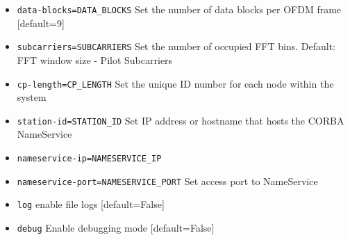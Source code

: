\begin{enumerate}
\begin{itemize}
		\item      \texttt{\option data-blocks=DATA\_BLOCKS} Set the number of data blocks per OFDM frame [default=9]
		\item      \texttt{\option subcarriers=SUBCARRIERS} Set the number of occupied FFT bins. Default: FFT window size - Pilot Subcarriers
		\item      \texttt{\option cp-length=CP\_LENGTH} Set the unique ID number for each node within the system
		\item      \texttt{\option station-id=STATION\_ID} Set IP address or hostname that hosts the CORBA NameService
		\item      \texttt{\option nameservice-ip=NAMESERVICE\_IP}
		\item      \texttt{\option nameservice-port=NAMESERVICE\_PORT} Set access port to NameService
		\item      \texttt{\option log}               enable file logs [default=False]
		\item      \texttt{\option debug}             Enable debugging mode [default=False]
	\end{itemize}


\end{enumerate}
